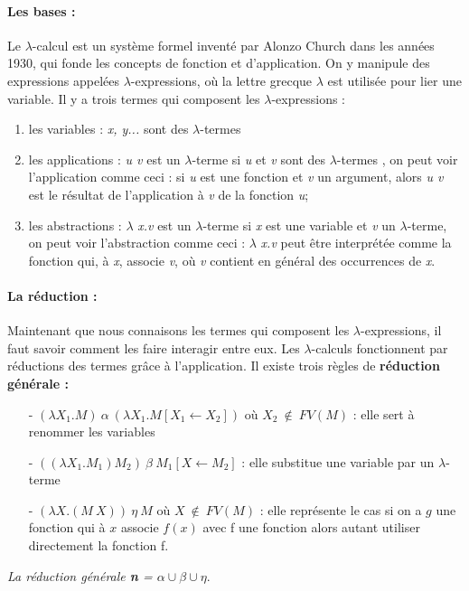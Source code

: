 \documentclass[10pt,a4paper]{article}
\begin{document}
				\paragraph{Les bases :}
				Le $\lambda$-calcul est un système formel inventé par Alonzo Church dans les années 1930, qui fonde les concepts de fonction et d'application. On y manipule des expressions appelées $\lambda$-expressions, où la lettre grecque $\lambda$ est utilisée pour lier une variable. Il y a trois termes qui composent les $\lambda$-expressions :
				\begin{enumerate}
					\item les variables : \textit{x, y...} sont des $\lambda$-termes 
					\item les applications : \textit{u v} est un $\lambda$-terme si \textit{u} et \textit{v} sont des $\lambda$-termes , on peut voir l'application comme ceci : si \textit{u} est une fonction et \textit{v} un argument, alors \textit{u v} est le résultat de l'application à \textit{v} de la fonction \textit{u}; 
					\item les abstractions : $\lambda$ \textit{x.v} est un $\lambda$-terme si \textit{x} est une variable et \textit{v} un $\lambda$-terme, on peut voir l'abstraction comme ceci : $\lambda$ \textit{x.v} peut être interprétée comme la fonction qui, à \textit{x}, associe \textit{v}, où \textit{v} contient en général des occurrences de \textit{x}.
				\end{enumerate}
				\bigbreak
				
				
				\paragraph{La réduction :}Maintenant que nous connaisons les termes qui composent les $\lambda$-expressions, il faut savoir comment les faire interagir entre eux. Les $\lambda$-calculs fonctionnent par réductions des termes grâce à l'application. Il existe trois règles de \textbf{réduction générale :}
				\begin{itemize}
					\item[-] $(\lambda X_{1}.M)~\alpha~(\lambda X_{1}.M[X_{1} \leftarrow X_{2}])$
					où $X_{2}~\notin~FV(M)$ : elle sert à renommer les variables
					\item[-] $((\lambda X_{1}.M_{1})M_{2})~\beta~M_{1}[X \leftarrow M_{2}]$ : elle substitue une variable par un $\lambda$-terme
    				\item[-] $(\lambda X.(M~X))~\eta~M$ 
					où $X~\notin~FV(M)$ : elle représente le cas si on a $g$ une fonction qui à $x$ associe  $f(x)$  avec f une fonction alors autant utiliser directement la fonction f.
				\end{itemize}
				\textit{La réduction générale \textbf{n} = $\alpha \cup \beta \cup \eta$}.
				\bigbreak
				
\end{document}
